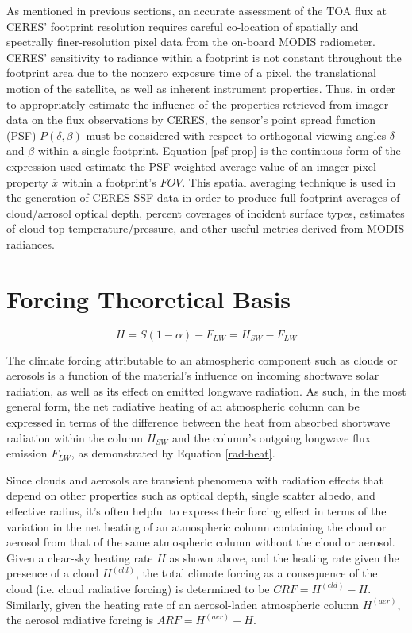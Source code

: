 \documentclass[12pt]{article}
\begin{document}
    As mentioned in previous sections, an accurate assessment of the TOA flux at CERES' footprint resolution requires careful co-location of spatially and spectrally finer-resolution pixel data from the on-board MODIS radiometer. CERES' sensitivity to radiance within a footprint is not constant throughout the footprint area due to the nonzero exposure time of a pixel, the translational motion of the satellite, as well as inherent instrument properties. Thus, in order to appropriately estimate the influence of the properties retrieved from imager data on the flux observations by CERES, the sensor's point spread function (PSF) $P(\delta,\beta)$ must be considered with respect to orthogonal viewing angles $\delta$ and $\beta$ within a single footprint. Equation \ref{psf-prop} is the continuous form of the expression used estimate the PSF-weighted average value of an imager pixel property $\overline{x}$ within a footprint's $FOV$. This spatial averaging technique is used in the generation of CERES SSF data in order to produce full-footprint averages of cloud/aerosol optical depth, percent coverages of incident surface types, estimates of cloud top temperature/pressure, and other useful metrics derived from MODIS radiances.

    \section{Forcing Theoretical Basis}

    \begin{equation}\label{rad-heat}
        H = S(1-\alpha) - F_{LW} = H_{SW} - F_{LW}
    \end{equation}

    The climate forcing attributable to an atmospheric component such as clouds or aerosols is a function of the material's influence on incoming shortwave solar radiation, as well as its effect on emitted longwave radiation. As such, in the most general form, the net radiative heating of an atmospheric column can be expressed in terms of the difference between the heat from absorbed shortwave radiation within the column $H_{SW}$ and the column's outgoing longwave flux emission $F_{LW}$, as demonstrated by Equation \ref{rad-heat}.

    Since clouds and aerosols are transient phenomena with radiation effects that depend on other properties such as optical depth, single scatter albedo, and effective radius, it's often helpful to express their forcing effect in terms of the variation in the net heating of an atmospheric column containing the cloud or aerosol from that of the same atmospheric column without the cloud or aerosol. Given a clear-sky heating rate $H$ as shown above, and the heating rate given the presence of a cloud $H^{(cld)}$, the total climate forcing as a consequence of the cloud (i.e. cloud radiative forcing) is determined to be $CRF = H^{(cld)} - H$. Similarly, given the heating rate of an aerosol-laden atmospheric column $H^{(aer)}$, the aerosol radiative forcing is $ARF = H^{(aer)} - H$.
\end{document}
